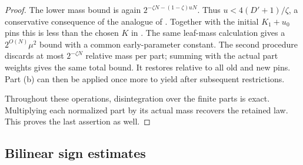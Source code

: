 \begin{proof}
The lower mass bound is again \(2^{-\zeta N-(1-\zeta)uN}\).
Thus \(u<4(D'+1)/\zeta\), a conservative consequence of the analogue of .
Together with the initial \(K_1+u_0\) pins this is less than the chosen \(K\) in .
The same leaf-mass calculation gives a \(2^{O(N)}\mu^2\) bound with a common early-parameter constant.
The second procedure discards at most \(2^{-\zeta N}\) relative mass per part; summing with the actual part weights gives the same total bound.
It restores  relative to all old and new pins.
Part (b) can then be applied once more to yield  after subsequent restrictions.

Throughout these operations, disintegration over the finite parts is exact.
Multiplying each normalized part by its actual mass recovers the retained law.
This proves the last assertion as well.
\end{proof}

\subsection{Bilinear sign estimates}

